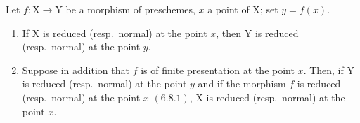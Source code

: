 \begin{proposition}[11.3.13]
\label{IV.11.3.13}
Let $f:\mathrm{X}\to\mathrm{Y}$ be a morphism of preschemes, $x$ a point of $\mathrm{X}$; set $y=f(x)$.
\begin{enumerate}[label=\emph{(\roman*)}]
  \item If $\mathrm{X}$ is reduced (resp.\ normal) at the point $x$, then $\mathrm{Y}$ is reduced (resp.\ normal) at the point $y$.
  \item Suppose in addition that $f$ is of finite presentation at the point $x$. Then, if $\mathrm{Y}$ is reduced (resp.\ normal) at the point $y$ and if the morphism $f$ is reduced (resp.\ normal) at the point $x$ $(6.8.1)$, $\mathrm{X}$ is reduced (resp.\ normal) at the point $x$.
\end{enumerate}
\end{proposition}

